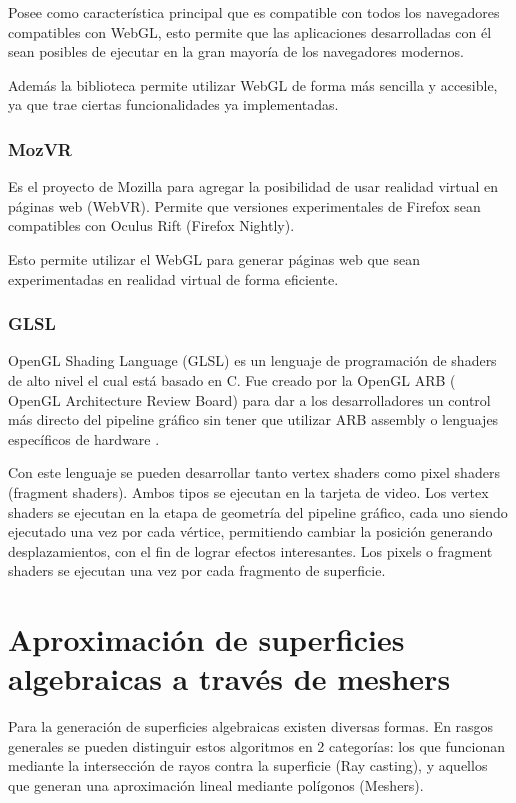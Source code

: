 \documentclass[12pt]{article}
\begin{document}
Posee como característica principal que es compatible con todos los navegadores compatibles con WebGL, esto permite que las aplicaciones desarrolladas con él sean posibles de ejecutar en la gran mayoría de los navegadores modernos.

Además la biblioteca permite utilizar WebGL de forma más sencilla y accesible, ya que trae ciertas funcionalidades ya implementadas.
\subsubsection{MozVR}
Es el proyecto de Mozilla para agregar la posibilidad de usar realidad virtual en páginas web (WebVR)\cite{mozvr}. Permite que versiones experimentales de Firefox sean compatibles con Oculus Rift (Firefox Nightly\cite{nightly}).

Esto permite utilizar el WebGL para generar páginas web que sean experimentadas en realidad virtual de forma eficiente.
\subsubsection{GLSL}
OpenGL Shading Language (GLSL) es un lenguaje de programación de shaders de alto nivel el cual está basado en C. Fue creado por la OpenGL ARB ( OpenGL Architecture Review Board) para dar a los desarrolladores un control más directo del pipeline gráfico sin tener que utilizar ARB assembly o lenguajes específicos de hardware .

Con este lenguaje se pueden desarrollar tanto vertex shaders como pixel shaders (fragment shaders). Ambos tipos se ejecutan en la tarjeta de video. Los vertex shaders se ejecutan en la etapa de geometría del pipeline gráfico, cada uno siendo ejecutado una vez por cada vértice, permitiendo cambiar la posición generando desplazamientos, con el fin de lograr efectos interesantes. Los pixels o fragment shaders se ejecutan una vez por cada fragmento de superficie.

\clearpage
\section{Aproximación de superficies algebraicas a través de meshers}
Para la generación de superficies algebraicas existen diversas formas. En rasgos generales se pueden distinguir estos algoritmos en 2 categorías: los que funcionan mediante la intersección de rayos contra la superficie (Ray casting), y aquellos que generan una aproximación lineal mediante polígonos (Meshers).
\end{document}
